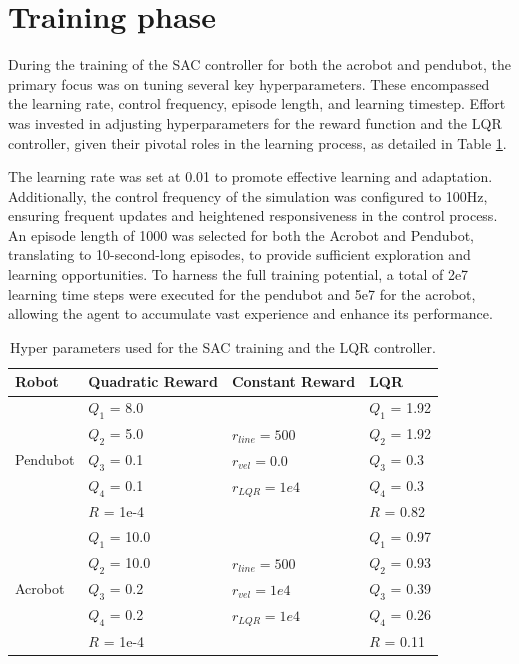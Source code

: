\section{Training phase}
During the training of the SAC controller for both the acrobot and pendubot, the primary focus was on tuning several key hyperparameters. These encompassed the learning rate, control frequency, episode length, and learning timestep. Effort was invested in adjusting hyperparameters for the reward function and the LQR controller, given their pivotal roles in the learning process, as detailed in Table \ref{tab:training_parameters}.

The learning rate was set at 0.01 to promote effective learning and adaptation. Additionally, the control frequency of the simulation was configured to 100Hz, ensuring frequent updates and heightened responsiveness in the control process. An episode length of 1000 was selected for both the Acrobot and Pendubot, translating to 10-second-long episodes, to provide sufficient exploration and learning opportunities. To harness the full training potential, a total of 2e7 learning time steps were executed for the pendubot and 5e7 for the acrobot, allowing the agent to accumulate vast experience and enhance its performance.

\begin{table}[H]
  \centering
  \begin{tabular}{p{2cm} | p{3cm} | p{3cm} | p{3cm}}
  Robot & Quadratic Reward  & Constant Reward & LQR\\
  \hline
  \multirow{5}{*}{Pendubot} & \(Q_1\) = 8.0  &  & \(Q_1\) = 1.92\\
  & \(Q_2\) = 5.0  & \(r_{line}=500\) & \(Q_2\) = 1.92\\
  & \(Q_3\) = 0.1  & \(r_{vel}=0.0\) & \(Q_3\) = 0.3\\
  & \(Q_4\) = 0.1  & \(r_{LQR}=1e4\)& \(Q_4\) = 0.3\\
  & \(R\) = 1e-4  & & \(R\) = 0.82\\
  \hline
  \multirow{5}{*}{Acrobot} & \(Q_1\) = 10.0  &  & \(Q_1\) = 0.97\\
  & \(Q_2\) = 10.0  & \(r_{line}=500\) & \(Q_2\) = 0.93\\
  & \(Q_3\) = 0.2  & \(r_{vel}=1e4\) & \(Q_3\) = 0.39\\
  & \(Q_4\) = 0.2  & \(r_{LQR}=1e4\) & \(Q_4\) = 0.26\\
  & \(R\) = 1e-4  &  & \(R\) = 0.11\\
  \end{tabular}
 \caption{Hyper parameters used for the SAC training and the LQR controller.}
 \label{tab:training_parameters}
\end{table}

